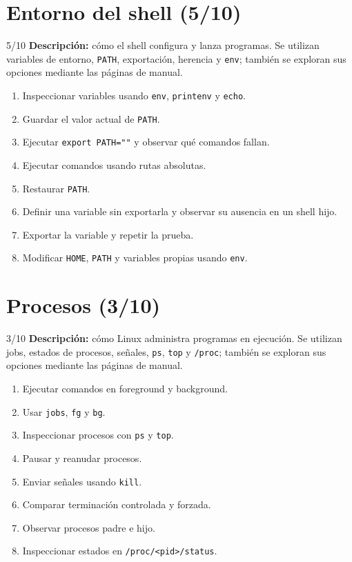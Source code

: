 \documentclass[11pt,a4paper]{article}
\begin{document}
\newpage
\section{Entorno del shell (5/10)}

\begin{trackbox}{5/10}
\textbf{Descripción:} cómo el shell configura y lanza programas. Se utilizan variables de entorno, \texttt{PATH}, exportación, herencia y \texttt{env}; también se exploran sus opciones mediante las páginas de manual.
\end{trackbox}

\begin{enumerate}
  \item Inspeccionar variables usando \texttt{env}, \texttt{printenv} y \texttt{echo}.
  \item Guardar el valor actual de \texttt{PATH}.
  \item Ejecutar \texttt{export PATH=""} y observar qué comandos fallan.
  \item Ejecutar comandos usando rutas absolutas.
  \item Restaurar \texttt{PATH}.
  \item Definir una variable sin exportarla y observar su ausencia en un shell hijo.
  \item Exportar la variable y repetir la prueba.
  \item Modificar \texttt{HOME}, \texttt{PATH} y variables propias usando \texttt{env}.
\end{enumerate}

\newpage
\section{Procesos (3/10)}

\begin{trackbox}{3/10}
\textbf{Descripción:} cómo Linux administra programas en ejecución. Se utilizan jobs, estados de procesos, señales, \texttt{ps}, \texttt{top} y \texttt{/proc}; también se exploran sus opciones mediante las páginas de manual.
\end{trackbox}

\begin{enumerate}
  \item Ejecutar comandos en foreground y background.
  \item Usar \texttt{jobs}, \texttt{fg} y \texttt{bg}.
  \item Inspeccionar procesos con \texttt{ps} y \texttt{top}.
  \item Pausar y reanudar procesos.
  \item Enviar señales usando \texttt{kill}.
  \item Comparar terminación controlada y forzada.
  \item Observar procesos padre e hijo.
  \item Inspeccionar estados en \texttt{/proc/<pid>/status}.
\end{enumerate}
\end{document}
